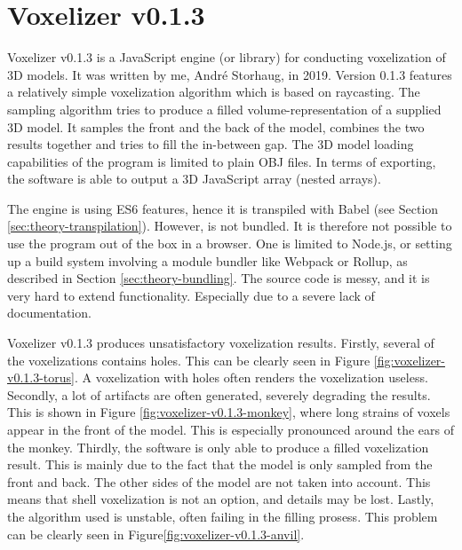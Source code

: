 \section{Voxelizer v0.1.3}
\label{sec:voxelizer-v013}
Voxelizer v0.1.3 \cite{voxelizer-v0.1.3} is a JavaScript engine (or library) for conducting voxelization of 3D models. It was written by me, André Storhaug, in 2019. Version 0.1.3 features a relatively simple voxelization algorithm which is based on raycasting. The sampling algorithm tries to produce a filled volume-representation of a supplied 3D model. It samples the front and the back of the model, combines the two results together and tries to fill the in-between gap. The 3D model loading capabilities of the program is limited to plain OBJ files. In terms of exporting, the software is able to output a 3D JavaScript array (nested arrays).

The engine is using ES6 features, hence it is transpiled with Babel (see Section \ref{sec:theory-transpilation}). However, is not bundled. It is therefore not possible to use the program out of the box in a browser. One is limited to Node.js, or setting up a build system involving a module bundler like Webpack or Rollup, as described in Section \ref{sec:theory-bundling}. The source code is messy, and it is very hard to extend functionality. Especially due to a severe lack of documentation.

Voxelizer v0.1.3 produces unsatisfactory voxelization results. Firstly, several of the voxelizations contains holes. This can be clearly seen in Figure \ref{fig:voxelizer-v0.1.3-torus}. A voxelization with holes often renders the voxelization useless. Secondly, a lot of artifacts are often generated, severely degrading the results. This is shown in Figure \ref{fig:voxelizer-v0.1.3-monkey}, where long strains of voxels appear in the front of the model. This is especially pronounced around the ears of the monkey. Thirdly, the software is only able to produce a filled voxelization result. This is mainly due to the fact that the model is only sampled from the front and back. The other sides of the model are not taken into account. This means that shell voxelization is not an option, and details may be lost. Lastly, the algorithm used is unstable, often failing in the filling prosess. This problem can be clearly seen in Figure\ref{fig:voxelizer-v0.1.3-anvil}.

